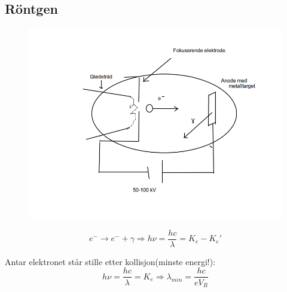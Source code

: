 \documentclass[a4paper,norsk, 10pt]{article}
\begin{document}
\subsection{Röntgen}
\begin{figure}[H]
\centering
\includegraphics[scale=0.2]{rontgen.png}
\end{figure}

\begin{equation}
e^- \rightarrow e^- + \gamma \Rightarrow h\nu = \frac{hc}{\lambda} = K_e - K_e'
\end{equation}

Antar elektronet står stille etter kollisjon(minste energi!):
\begin{equation}
h\nu = \frac{hc}{\lambda} = K_e \Rightarrow \lambda_{min} = \frac{hc}{eV_R}
\end{equation}
\end{document}
